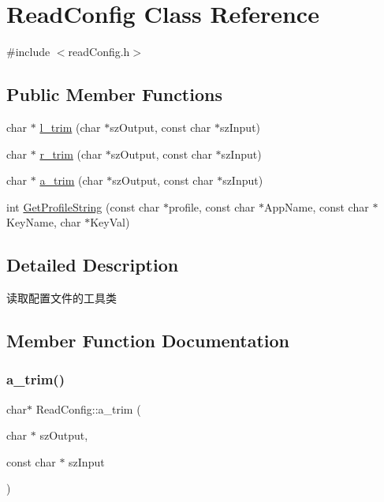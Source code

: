 \hypertarget{classReadConfig}{}\section{Read\+Config Class Reference}
\label{classReadConfig}


{\ttfamily \#include $<$read\+Config.\+h$>$}

\subsection*{Public Member Functions}
\begin{DoxyCompactItemize}
\item 
char $\ast$ \hyperlink{classReadConfig_aa9e874be51af8937981d9e9c22339d39}{l\+\_\+trim} (char $\ast$sz\+Output, const char $\ast$sz\+Input)
\item 
char $\ast$ \hyperlink{classReadConfig_af726f6b598258c2672871fe720848327}{r\+\_\+trim} (char $\ast$sz\+Output, const char $\ast$sz\+Input)
\item 
char $\ast$ \hyperlink{classReadConfig_a2ad2a8fbfa2add5fa54fdfdae3953077}{a\+\_\+trim} (char $\ast$sz\+Output, const char $\ast$sz\+Input)
\item 
int \hyperlink{classReadConfig_aead8f510f2da60b56cbb0ec3f9f8bacb}{Get\+Profile\+String} (const char $\ast$profile, const char $\ast$App\+Name, const char $\ast$Key\+Name, char $\ast$Key\+Val)
\end{DoxyCompactItemize}


\subsection{Detailed Description}
读取配置文件的工具类 

\subsection{Member Function Documentation}
\mbox{\label{classReadConfig_a2ad2a8fbfa2add5fa54fdfdae3953077}} 
\subsubsection{\texorpdfstring{a\+\_\+trim()}{a\_trim()}}
{\footnotesize\ttfamily char$\ast$ Read\+Config\+::a\+\_\+trim (\begin{DoxyParamCaption}\item[{char $\ast$}]{sz\+Output,  }\item[{const char $\ast$}]{sz\+Input }\end{DoxyParamCaption})\hspace{0.3cm}{\ttfamily [inline]}}

